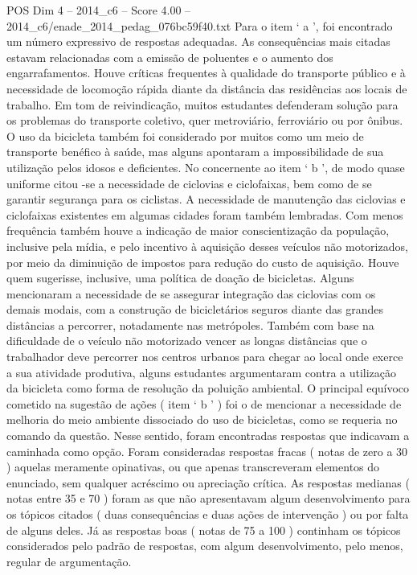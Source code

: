 \begin{textsample}{POS Dim 4 – 2014\_c6 – Score 4.00 – 2014\_c6/enade\_2014\_pedag\_076bc59f40.txt}
Para o item ‘ a ’, foi encontrado um número expressivo de respostas adequadas.
As consequências mais citadas estavam relacionadas com a emissão de poluentes e o aumento dos engarrafamentos.
Houve críticas frequentes à qualidade do transporte público e à necessidade de locomoção rápida diante da distância das residências aos locais de trabalho.
Em tom de reivindicação, muitos estudantes defenderam solução para os problemas do transporte coletivo, quer metroviário, ferroviário ou por ônibus.
O uso da bicicleta também foi considerado por muitos como um meio de transporte benéfico à saúde, mas alguns apontaram a impossibilidade de sua utilização pelos idosos e deficientes.
No concernente ao item ‘ b ’, de modo quase uniforme citou -se a necessidade de ciclovias e ciclofaixas, bem como de se garantir segurança para os ciclistas.
A necessidade de manutenção das ciclovias e ciclofaixas existentes em algumas cidades foram também lembradas.
Com menos frequência também houve a indicação de maior conscientização da população, inclusive pela mídia, e pelo incentivo à aquisição desses veículos não motorizados, por meio da diminuição de impostos para redução do custo de aquisição.
Houve quem sugerisse, inclusive, uma política de doação de bicicletas.
Alguns mencionaram a necessidade de se assegurar integração das ciclovias com os demais modais, com a construção de bicicletários seguros diante das grandes distâncias a percorrer, notadamente nas metrópoles.
Também com base na dificuldade de o veículo não motorizado vencer as longas distâncias que o trabalhador deve percorrer nos centros urbanos para chegar ao local onde exerce a sua atividade produtiva, alguns estudantes argumentaram contra a utilização da bicicleta como forma de resolução da poluição ambiental.
O principal equívoco cometido na sugestão de ações ( item ‘ b ’ ) foi o de mencionar a necessidade de melhoria do meio ambiente dissociado do uso de bicicletas, como se requeria no comando da questão.
Nesse sentido, foram encontradas respostas que indicavam a caminhada como opção.
Foram consideradas respostas fracas ( notas de zero a 30 ) aquelas meramente opinativas, ou que apenas transcreveram elementos do enunciado, sem qualquer acréscimo ou apreciação crítica.
As respostas medianas ( notas entre 35 e 70 ) foram as que não apresentavam algum desenvolvimento para os tópicos citados ( duas consequências e duas ações de intervenção ) ou por falta de alguns deles.
Já as respostas boas ( notas de 75 a 100 ) continham os tópicos considerados pelo padrão de respostas, com algum desenvolvimento, pelo menos, regular de argumentação.

\end{textsample}
